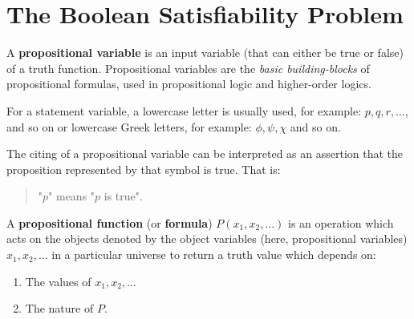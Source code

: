 \iffalse
\section{Introduction to Automated Theorem Proving}
Automated Theorem Proving (ATP) is a critical area within automated reasoning that focuses on the development of computer programs capable of proving mathematical theorems automatically. ATP systems are designed to assist mathematicians, logicians, and computer scientists in validating the correctness of propositions and theorems without human intervention.
\fi
\section{The Boolean Satisfiability Problem}
\begin{tcolorbox}[colframe=defcolor,title={\color{white}\bf Propositional Variable}]
\begin{definition}
A \textbf{propositional variable} is an input variable (that can either be true or false) of a truth function. Propositional variables are the \textit{basic building-blocks} of propositional formulas, used in propositional logic and higher-order logics.
\end{definition}
\end{tcolorbox}
\begin{example}
For a statement variable, a lowercase letter is usually used, for example:
$p,q,r,\dots$, and so on
or lowercase Greek letters, for example:
$\phi, \psi, \chi$ and so on.
\end{example}
\begin{remark}
The citing of a propositional variable can be interpreted as an assertion that the proposition represented by that symbol is true.
That is:
\begin{quote}
"$p$" means "$p$ is true".
\end{quote}
\end{remark}

\begin{tcolorbox}[colframe=defcolor,title={\color{white}\bf Propositional Function (Formula)}]
\begin{definition}
A \textbf{propositional function} (or \textbf{formula}) $P(x_1,x_2,\dots)$
is an operation which acts on the objects denoted by the object variables (here, propositional variables) $x_1,x_2,\dots$
in a particular universe to return a truth value which depends on:
\begin{enumerate}[(1)]
	\item The values of $x_1,x_2,\dots$
	\item The nature of $P$.
\end{enumerate}
\end{definition}
\end{tcolorbox}

